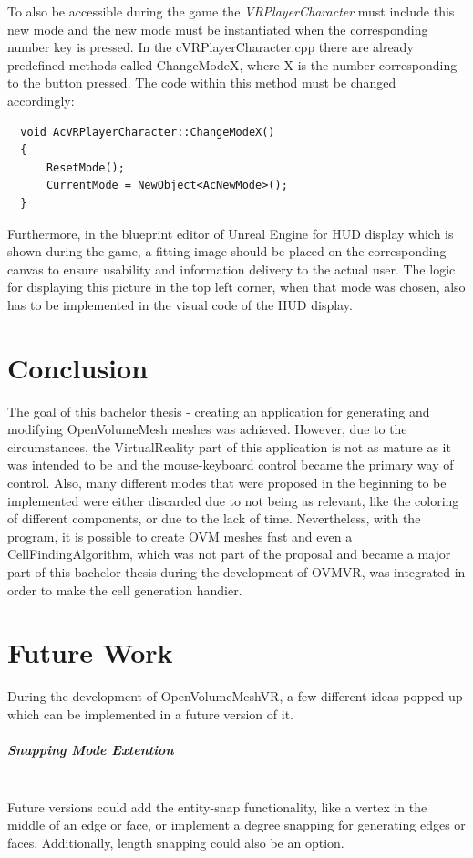 \documentclass{report}
\begin{document}
		To also be accessible during the game the \textit{VRPlayerCharacter} must include this new mode and the new mode must be instantiated when the corresponding number key is pressed. In the cVRPlayerCharacter.cpp there are already predefined methods called ChangeModeX, where X is the number corresponding to the button pressed. The code within this method must be changed accordingly:
		\begin{verbatim}
  void AcVRPlayerCharacter::ChangeModeX()
  {
      ResetMode();
      CurrentMode = NewObject<AcNewMode>();
  }	
		\end{verbatim}
		Furthermore, in the blueprint editor of Unreal Engine for HUD display which is shown during the game, a fitting image should be placed on the corresponding canvas to ensure usability and information delivery to the actual user. The logic for displaying this picture in the top left corner, when that mode was chosen, also has to be implemented in the visual code of the HUD display.
	\closesection
	
	
\chapter{Conclusion}	
	The goal of this bachelor thesis - creating an application for generating and modifying OpenVolumeMesh meshes was achieved. However, due to the circumstances, the VirtualReality part of this application is not as mature as it was intended to be and the mouse-keyboard control became the primary way of control. Also, many different modes that were proposed in the beginning to be implemented were either discarded due to not being as relevant, like the coloring of different components, or due to the lack of time. Nevertheless, with the program, it is possible to create OVM meshes fast and even a CellFindingAlgorithm, which was not part of the proposal and became a major part of this bachelor thesis during the development of OVMVR, was integrated in order to make the cell generation handier.


\chapter{Future Work}
	During the development of OpenVolumeMeshVR, a few different ideas popped up which can be implemented in a future version of it.
	\paragraph{Snapping Mode Extention} \hfill \\
	Future versions could add the entity-snap functionality, like a vertex in the middle of an edge or face, or implement a degree snapping for generating edges or faces. Additionally, length snapping could also be an option.
\end{document}
